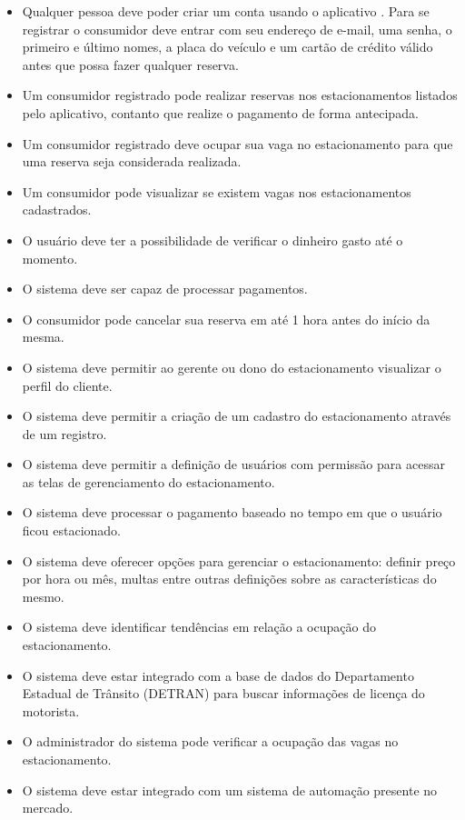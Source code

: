 \begin{itemize}
	\item Qualquer pessoa deve poder criar um conta usando o aplicativo \projectName{}. Para se registrar o consumidor deve entrar com seu endereço de e-mail, uma senha, o primeiro e último nomes, a placa do veículo e um cartão de crédito válido antes que possa fazer qualquer reserva.
	\item Um consumidor registrado pode realizar reservas nos estacionamentos listados pelo aplicativo, contanto que realize o pagamento de forma antecipada.
	\item Um consumidor registrado deve ocupar sua vaga no estacionamento para que uma reserva seja considerada realizada.
	\item Um consumidor pode visualizar se existem vagas nos estacionamentos cadastrados.
	\item O usuário deve ter a possibilidade de verificar o dinheiro gasto até o momento.
	\item O sistema deve ser capaz de processar pagamentos.
	\item O consumidor pode cancelar sua reserva em até 1 hora antes do início da mesma.
	\item O sistema deve permitir ao gerente ou dono do estacionamento visualizar o perfil do cliente.
	\item O sistema deve permitir a criação de um cadastro do estacionamento através de um registro.
	\item O sistema deve permitir a definição de usuários com permissão para acessar as telas de gerenciamento do estacionamento.
	\item O sistema deve processar o pagamento baseado no tempo em que o usuário ficou estacionado.
	\item O sistema deve oferecer opções para gerenciar o estacionamento: definir preço por hora ou mês, multas entre outras definições sobre as características do mesmo.
	\item O sistema deve identificar tendências em relação a ocupação do estacionamento.
	\item O sistema deve estar integrado com a base de dados do Departamento Estadual de Trânsito (DETRAN) para buscar informações de licença do motorista.
	\item O administrador do sistema pode verificar a ocupação das vagas no estacionamento.
	\item O sistema deve estar integrado com um sistema de automação presente no mercado.
\end{itemize}

